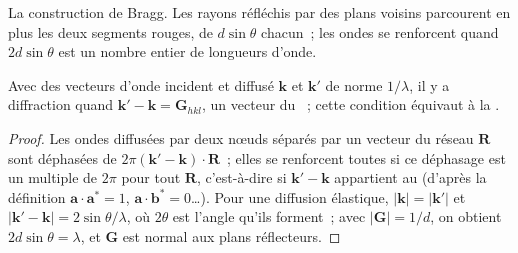 \begin{omfigure}

{\small La construction de Bragg. Les rayons réfléchis par des plans
voisins parcourent en plus les deux segments rouges, de $d\sin\theta$
chacun~; les ondes se renforcent quand
$2d\sin\theta$ est un nombre entier de longueurs d'onde.}
\end{omfigure}

\begin{proposition}\label{prop:b3:x-ray-diffraction:laue}
Avec des vecteurs d'onde incident et diffusé $\mathbf k$ et $\mathbf k'$
de norme
$1/\lambda$, il y a diffraction quand $\mathbf k' - \mathbf k = \mathbf G_{hkl}$,
un vecteur du ~; cette condition équivaut à la .
\end{proposition}

\begin{proof}
Les ondes diffusées par deux nœuds séparés par un vecteur du réseau
$\mathbf R$ sont déphasées de $2\pi(\mathbf k' - \mathbf k)\cdot\mathbf R$~;
elles se renforcent toutes si ce déphasage est un multiple de $2\pi$
pour tout $\mathbf R$, c'est-à-dire si $\mathbf k' - \mathbf k$ appartient
au  (d'après la
définition $\mathbf a\cdot\mathbf a^* = 1$, $\mathbf a\cdot\mathbf b^* = 0$\dots).
Pour une diffusion élastique,
$|\mathbf k| = |\mathbf k'|$ et $|\mathbf k' - \mathbf k| = 2\sin\theta/\lambda$,
où $2\theta$ est l'angle qu'ils forment~; avec $|\mathbf G| = 1/d$, on
obtient $2d\sin\theta = \lambda$, et $\mathbf G$ est normal aux plans
réflecteurs.
\end{proof}

